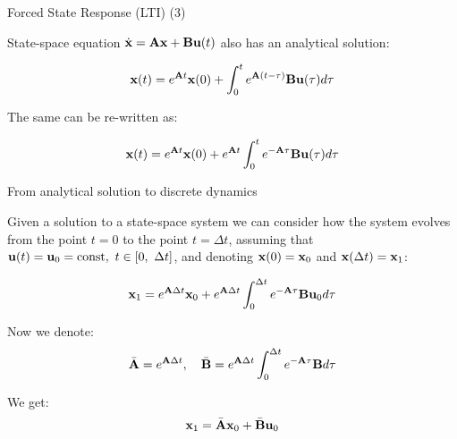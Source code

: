 \documentclass{beamer}
\begin{document}
\begin{frame}{Forced State Response (LTI) (3)}
	\begin{flushleft}
		
		State-space equation $\dot{\mathbf{x}} = \mathbf{A}  \mathbf{x} + \mathbf{B}  \mathbf{u}(t)$ also has an analytical solution:
		
		\begin{equation}
			\mathbf{x}(t) = e^{\mathbf{A}t}  \mathbf{x}(0) + 
			\int_{0}^{t} e^{\mathbf{A}(t-\tau)} \mathbf{B}  \mathbf{u}(\tau) d\tau
		\end{equation}
		
		The same can be re-written as:
		
		\begin{equation}
			\mathbf{x}(t) = e^{\mathbf{A}t}  \mathbf{x}(0) + 
			e^{\mathbf{A}t} \int_{0}^{t} e^{-\mathbf{A}\tau} \mathbf{B}  \mathbf{u}(\tau) d\tau
		\end{equation}
		
	\end{flushleft}
\end{frame}






\begin{frame}
	
	
\end{frame}





\begin{frame}{From analytical solution to discrete dynamics}
	\begin{flushleft}
		Given a solution to a state-space system we can consider how the system evolves from the point $t=0$ to the point $t=\Delta t$, assuming that $\mathbf{u}(t) = \mathbf{u}_0 = \text{const}, \ t \in [ 0, \ \Delta t ]$, and denoting $\mathbf{x}(0) = \mathbf{x}_0$ and $\mathbf{x}(\Delta t) = \mathbf{x}_1$:
		
		\begin{equation}
			\mathbf{x}_1 = e^{\mathbf{A}\Delta t}  \mathbf{x}_0 + 
			e^{\mathbf{A} \Delta t} \int_{0}^{\Delta t} e^{-\mathbf{A}\tau} \mathbf{B}  \mathbf{u}_0 d\tau
		\end{equation}
		
		Now we denote:
		\begin{align}
			\bar{\mathbf{A}} = e^{\mathbf{A}\Delta t}, \ \ \
			\bar{\mathbf{B}} = e^{\mathbf{A} \Delta t} \int_{0}^{\Delta t} e^{-\mathbf{A}\tau} \mathbf{B} d\tau
		\end{align}
	
		We get:
		\begin{equation}
			\mathbf{x}_1 = \bar{\mathbf{A}}  \mathbf{x}_0 + \bar{\mathbf{B}}  \mathbf{u}_0
		\end{equation}		
		
	\end{flushleft}
\end{frame}
\end{document}
